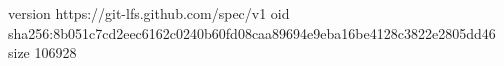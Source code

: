 version https://git-lfs.github.com/spec/v1
oid sha256:8b051c7cd2eec6162c0240b60fd08caa89694e9eba16be4128c3822e2805dd46
size 106928
